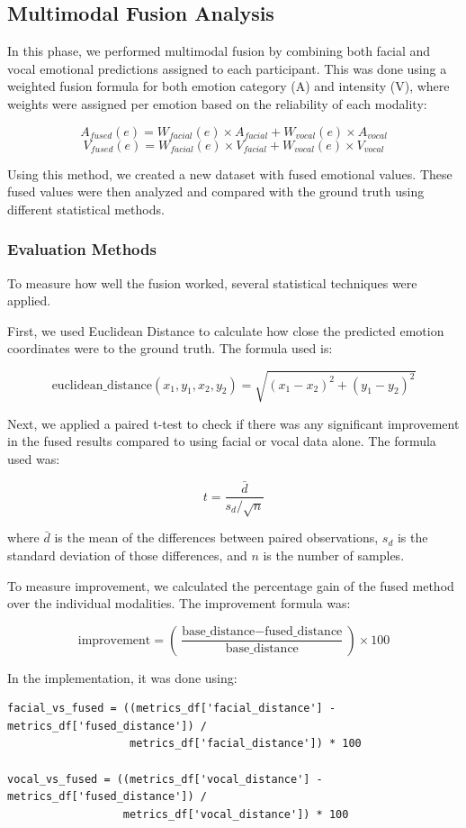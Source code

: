 \subsection{Multimodal Fusion Analysis}
In this phase, we performed multimodal fusion by combining both facial and vocal emotional predictions assigned to each participant. This was done using a weighted fusion formula for both emotion category (A) and intensity (V), where weights were assigned per emotion based on the reliability of each modality:
 
\[
A_{fused}(e) = W_{facial}(e) \times A_{facial} + W_{vocal}(e) \times A_{vocal}
\]
\[
V_{fused}(e) = W_{facial}(e) \times V_{facial} + W_{vocal}(e) \times V_{vocal}
\]
 
Using this method, we created a new dataset with fused emotional values. These fused values were then analyzed and compared with the ground truth using different statistical methods.

\subsubsection*{Evaluation Methods}
To measure how well the fusion worked, several statistical techniques were applied.

First, we used Euclidean Distance to calculate how close the predicted emotion coordinates were to the ground truth. The formula used is:

\[
\text{euclidean\_distance}(x_1, y_1, x_2, y_2) = \sqrt{(x_1 - x_2)^2 + (y_1 - y_2)^2}
\]

Next, we applied a paired t-test to check if there was any significant improvement in the fused results compared to using facial or vocal data alone. The formula used was:

\[
t = \frac{\bar{d}}{s_d / \sqrt{n}}
\]

where $\bar{d}$ is the mean of the differences between paired observations, $s_d$ is the standard deviation of those differences, and $n$ is the number of samples.

To measure improvement, we calculated the percentage gain of the fused method over the individual modalities. The improvement formula was:

\[
\text{improvement} = \left(\frac{\text{base\_distance} - \text{fused\_distance}}{\text{base\_distance}}\right) \times 100
\]

In the implementation, it was done using:

\begin{verbatim}
facial_vs_fused = ((metrics_df['facial_distance'] - metrics_df['fused_distance']) /
                   metrics_df['facial_distance']) * 100

vocal_vs_fused = ((metrics_df['vocal_distance'] - metrics_df['fused_distance']) /
                  metrics_df['vocal_distance']) * 100
\end{verbatim}

